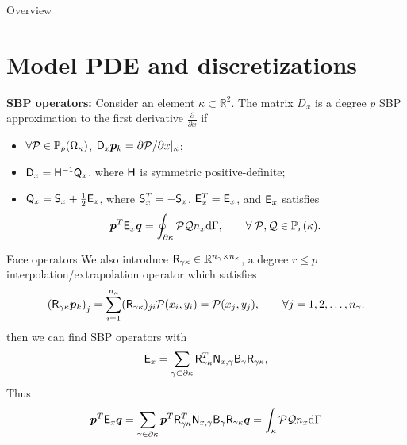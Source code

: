\documentclass{beamer}
\begin{document}
\begin{frame}{Overview}
    \tableofcontents[hideallsubsections]
\end{frame}

\section{Model PDE and discretizations}

\begin{frame}
    \begin{definition}{}
        \textbf{SBP operators:} Consider an element $\kappa \subset \mathbb{R}^2$. The matrix $D_x$ is a degree $p$ SBP approximation to the first derivative $\frac{\partial}{\partial x}$ if 
        \begin{itemize}
            \item $\forall \mathcal{P} \in \mathbb{P}_{p}(\Omega_{\kappa})$, $\mathsf{D}_{x}\bm{p}_{k} = \partial \mathcal{P}/\partial x |_{\kappa}$;
            \item $\mathsf{D}_{x} = \mathsf{H}^{-1}\mathsf{Q}_{x}$, where $\mathsf{H}$ is symmetric positive-definite;
            \item $\mathsf{Q}_{x} = \mathsf{S}_{x} + \frac{1}{2}\mathsf{E}_{x}$, where $\mathsf{S}_{x}^T=-\mathsf{S}_{x}$, $\mathsf{E}_{x}^T=\mathsf{E}_{x}$, and
            $\mathsf{E}_{x}$ satisfies
            \begin{equation*}
            \bm{p}^T\mathsf{E}_{x}\bm{q} =\displaystyle\oint_{\partial{\kappa}} \mathcal{P} \mathcal{Q} n_{x}
            \mathrm{d}\Gamma,
            \qquad\forall\; \mathcal{P}, \mathcal{Q} \in \mathbb{P}_{r}({\kappa}).
            \end{equation*}
        \end{itemize}
    \end{definition}
\end{frame}

\begin{frame} {Face operators}
    We also introduce $\mathsf{R}_{\gamma\kappa} \in \mathbb{R}^{n_\gamma \times n_\kappa}$, a degree $r \le p$ interpolation/extrapolation operator which satisfies
    \begin{equation*}
    \left(\mathsf{R}_{\gamma\kappa} \bm{p}_{k}\right)_{j} = 
    \sum_{i=1}^{n_{\kappa}} (\mathsf{R}_{\gamma\kappa})_{ji} \mathcal{P}(x_{i},y_{i}) 
    = \mathcal{P}(x_{j},y_{j}),
    \qquad\forall j=1,2,\ldots,n_{\gamma}.
    \end{equation*}
    then we can find SBP operators with 
    \begin{equation*}
    \mathsf{E}_{x} = \sum_{\gamma \subset \partial \kappa} \mathsf{R}_{\gamma\kappa}^{T} \mathsf{N}_{x,\gamma} \mathsf{B}_{\gamma} \mathsf{R}_{\gamma\kappa},
    \end{equation*}
    Thus
    \begin{equation*}
    \bm{p}^T \mathsf{E}_{x} \bm{q} = \sum_{\gamma \in \partial\kappa} \bm{p}^T \mathsf{R}_{\gamma\kappa}^T\mathsf{N}_{x,\gamma}\mathsf{B}_{\gamma}\mathsf{R}_{\gamma\kappa}\bm{q} = \int_{\kappa}\mathcal{P}\mathcal{Q} n_x\mathrm{d} \Gamma
    \end{equation*}
\end{frame}
\end{document}
